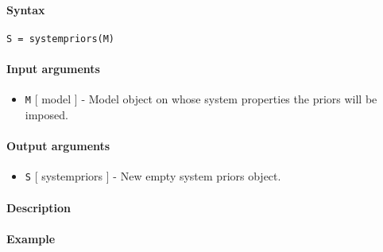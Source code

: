 


	\paragraph{Syntax}\label{syntax}

\begin{verbatim}
S = systempriors(M)
\end{verbatim}

\paragraph{Input arguments}\label{input-arguments}

\begin{itemize}
\itemsep1pt\parskip0pt
\item
  \texttt{M} {[} model {]} - Model object on whose system properties the
  priors will be imposed.
\end{itemize}

\paragraph{Output arguments}\label{output-arguments}

\begin{itemize}
\itemsep1pt\parskip0pt
\item
  \texttt{S} {[} systempriors {]} - New empty system priors object.
\end{itemize}

\paragraph{Description}\label{description}

\paragraph{Example}\label{example}


